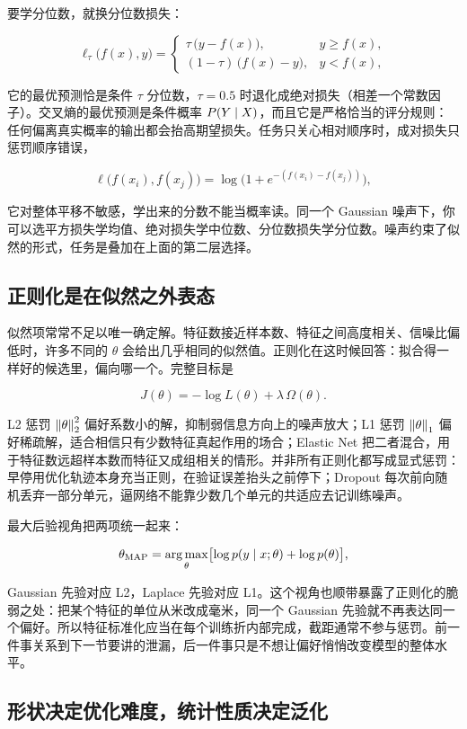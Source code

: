 要学分位数，就换分位数损失：

\[
\ell_\tau\bigl(f(x),y\bigr)=
\begin{cases}
\tau\,\bigl(y-f(x)\bigr), & y\ge f(x),\\
(1-\tau)\,\bigl(f(x)-y\bigr), & y<f(x),
\end{cases}
\]

它的最优预测恰是条件 \(\tau\) 分位数，\(\tau=0.5\) 时退化成绝对损失（相差一个常数因子）。交叉熵的最优预测是条件概率 \(P(Y\mid X)\)，而且它是严格恰当的评分规则：任何偏离真实概率的输出都会抬高期望损失。任务只关心相对顺序时，成对损失只惩罚顺序错误，

\[
\ell\bigl(f(x_i),f(x_j)\bigr)=\log\bigl(1+e^{-(f(x_i)-f(x_j))}\bigr),
\]

它对整体平移不敏感，学出来的分数不能当概率读。同一个 Gaussian 噪声下，你可以选平方损失学均值、绝对损失学中位数、分位数损失学分位数。噪声约束了似然的形式，任务是叠加在上面的第二层选择。

\subsection{正则化是在似然之外表态}

似然项常常不足以唯一确定解。特征数接近样本数、特征之间高度相关、信噪比偏低时，许多不同的 \(\theta\) 会给出几乎相同的似然值。正则化在这时候回答：拟合得一样好的候选里，偏向哪一个。完整目标是

\[
J(\theta)=-\log L(\theta)+\lambda\,\Omega(\theta).
\]

L2 惩罚 \(\left\lVert\theta\right\rVert_2^2\) 偏好系数小的解，抑制弱信息方向上的噪声放大；L1 惩罚 \(\left\lVert\theta\right\rVert_1\) 偏好稀疏解，适合相信只有少数特征真起作用的场合；Elastic Net 把二者混合，用于特征数远超样本数而特征又成组相关的情形。并非所有正则化都写成显式惩罚：早停用优化轨迹本身充当正则，在验证误差抬头之前停下；Dropout 每次前向随机丢弃一部分单元，逼网络不能靠少数几个单元的共适应去记训练噪声。

最大后验视角把两项统一起来：

\[
\theta_{\mathrm{MAP}}=\operatorname*{arg\,max}_\theta\bigl[\log p(y\mid x;\theta)+\log p(\theta)\bigr],
\]

Gaussian 先验对应 L2，Laplace 先验对应 L1。这个视角也顺带暴露了正则化的脆弱之处：把某个特征的单位从米改成毫米，同一个 Gaussian 先验就不再表达同一个偏好。所以特征标准化应当在每个训练折内部完成，截距通常不参与惩罚。前一件事关系到下一节要讲的泄漏，后一件事只是不想让偏好悄悄改变模型的整体水平。

\subsection{形状决定优化难度，统计性质决定泛化}

